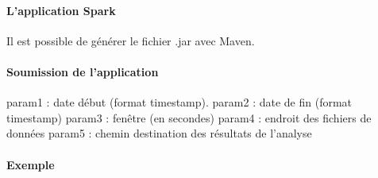 \documentclass[]{report}
\begin{document}
\paragraph{L'application Spark}
Il est possible de générer le fichier .jar avec Maven.

\paragraph{Soumission de l'application}
param1 : date début (format timestamp).
param2 : date de fin (format timestamp)
param3 : fenêtre   (en secondes)
param4 : endroit des fichiers de données
param5 : chemin destination des résultats de l'analyse

\paragraph{Exemple}
\end{document}
